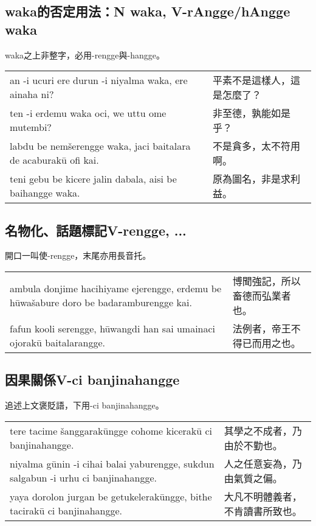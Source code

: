 \documentclass{article}
\begin{document}
\subsection{waka的否定用法：N waka, V-rAngge/hAngge waka}
\noindent waka之上非整字，必用-rengge與-hangge。
\begin{center}
    \begin{tabularx}{\textwidth}{XX}
        an -i ucuri ere durun -i niyalma waka, ere ainaha ni? & 平素不是這樣人，這是怎麼了？\\
        ten -i erdemu waka oci, we uttu ome mutembi? & 非至德，孰能如是乎？\\
        labdu be nem\v{s}erengge waka, jaci baitalara de acaburak\={u} ofi kai. & 不是貪多，太不符用啊。\\
        teni gebu be kicere jalin dabala, aisi be baihangge waka. & 原為圖名，非是求利益。
    \end{tabularx}
\end{center}

\subsection{名物化、話題標記V-rengge, ...}
\noindent 開口一叫使-rengge，末尾亦用長音托。
\begin{center}
    \begin{tabularx}{\textwidth}{XX}
        ambula donjime hacihiyame ejerengge, erdemu be h\={u}wa\v{s}abure doro be badaramburengge kai. & 博聞強記，所以畜德而弘業者也。\\
        fafun kooli serengge, h\={u}wangdi han sai umainaci ojorak\={u} baitalarangge. & 法例者，帝王不得已而用之也。
    \end{tabularx}
\end{center}

\subsection{因果關係V-ci banjinahangge}
\noindent 追述上文褒貶語，下用-ci banjinahangge。
\begin{center}
    \begin{tabularx}{\textwidth}{XX}
        tere tacime \v{s}anggarak\={u}ngge cohome kicerak\={u} ci banjinahangge. & 其學之不成者，乃由於不勤也。\\
        niyalma g\={u}nin -i cihai balai yaburengge, sukdun salgabun -i urhu ci banjinahangge. & 人之任意妄為，乃由氣質之偏。\\
        yaya dorolon jurgan be getukelerak\={u}ngge, bithe tacirak\={u} ci banjinahangge. & 大凡不明體義者，不肯讀書所致也。
    \end{tabularx}
\end{center}
\end{document}

